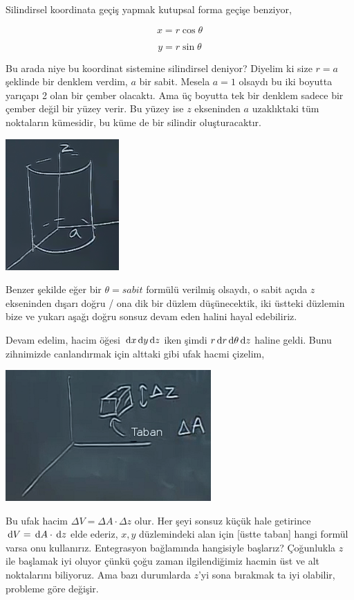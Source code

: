 \documentclass[12pt,fleqn]{article}\usepackage{../../common}
\begin{document}
Silindirsel koordinata geçiş yapmak kutupsal forma geçişe benziyor,

$$ x = r\cos\theta $$

$$ y = r\sin\theta $$

Bu arada niye bu koordinat sistemine silindirsel deniyor? Diyelim ki size
$r = a$ şeklinde bir denklem verdim, $a$ bir sabit. Mesela $a=1$ olsaydı bu
iki boyutta yarıçapı 2 olan bir çember olacaktı. Ama üç boyutta tek bir
denklem sadece bir çember değil bir yüzey verir. Bu yüzey ise $z$
ekseninden $a$ uzaklıktaki tüm noktaların kümesidir, bu küme de bir
silindir oluşturacaktır.

\begin{center}
\includegraphics[height=5cm]{25_9.png}
\end{center}

Benzer şekilde eğer bir $\theta=sabit$ formülü verilmiş olsaydı, o sabit
açıda $z$ ekseninden dışarı doğru / ona dik bir düzlem düşünecektik, iki
üstteki düzlemin bize ve yukarı aşağı doğru sonsuz devam eden halini hayal
edebiliriz.

Devam edelim, hacim öğesi $\,\mathrm{d} x \,\mathrm{d} y \,\mathrm{d} z$ iken şimdi $r \,\mathrm{d} r \,\mathrm{d}
\theta \,\mathrm{d} z$ haline geldi. Bunu zihnimizde canlandırmak için alttaki gibi
ufak hacmi çizelim, 

\begin{center}
\includegraphics[height=5cm]{25_10.png}
\end{center}

Bu ufak hacim $\Delta V = \Delta A \cdot \Delta z$ olur. Her şeyi sonsuz
küçük hale getirince $\,\mathrm{d} V = \,\mathrm{d} A \cdot \,\mathrm{d} z$ elde ederiz, $x,y$
düzlemindeki alan için [üstte taban] hangi formül varsa onu
kullanırız. Entegrasyon bağlamında hangisiyle başlarız? Çoğunlukla $z$ ile
başlamak iyi oluyor çünkü çoğu zaman ilgilendiğimiz hacmin üst ve alt
noktalarını biliyoruz. Ama bazı durumlarda $z$'yi sona bırakmak ta iyi
olabilir, probleme göre değişir.
\end{document}
